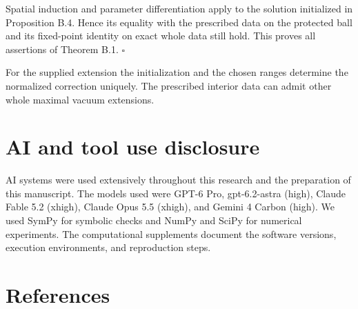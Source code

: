 \documentclass[
  english,
  11pt,
  reqno]{amsart}
\begin{document}
Spatial induction and parameter differentiation apply to the solution
initialized in Proposition B.4. Hence its equality with the prescribed
data on the protected ball and its fixed-point identity on exact whole
data still hold. This proves all assertions of Theorem B.1.
\hfill\(\square\)

For the supplied extension the initialization and the chosen ranges
determine the normalized correction uniquely. The prescribed interior
data can admit other whole maximal vacuum extensions.

\section{AI and tool use disclosure}\label{ai-and-tool-use-disclosure}\label{sec:ai-and-tool-use-disclosure}

\begingroup{}\relax
AI systems were used extensively throughout this research and the
preparation of this manuscript. The models used were GPT-6 Pro,
gpt-6.2-astra (high), Claude Fable 5.2 (xhigh), Claude Opus 5.5 (xhigh),
and Gemini 4 Carbon (high). We used SymPy for symbolic checks and NumPy and SciPy for numerical
experiments. The computational supplements document the software
versions, execution environments, and reproduction steps.\par\endgroup

\section{References}\label{references}\label{sec:online-coverage-references}
\end{document}
